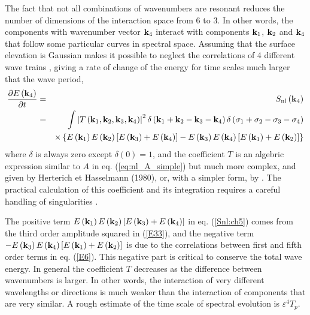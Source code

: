 The fact that not all combinations of wavenumbers are resonant reduces 
the number of dimensions of the interaction space from 6 to 3.  In other words, the components with wavenumber vector $\mathbf{k}_4$ interact with components 
$\mathbf{k}_1$, $\mathbf{k}_2$ and $\mathbf{k}_4$ that follow some particular curves in spectral space. Assuming that the surface elevation is Gaussian makes it possible to neglect 
the correlations of 4 different wave trains \citep{Hasselmann1962},  giving a rate of change of the energy for time scales much larger that the wave period, 
\begin{eqnarray}
\frac{\partial E \left(\mathbf{k}_4\right)}{\partial t}
    & = & S_{\mathrm{nl}} \left( \mathbf{k}_4 \right) \nonumber\\
    & = & \int
    \left|T \left(\mathbf{k}_1,\mathbf{k}_2,\mathbf{k}_3,\mathbf{k}_4 \right)
    \right|^2
 \delta\left(\mathbf{k}_1+\mathbf{k}_2-\mathbf{k}_3-\mathbf{k}_4\right)
    \delta\left(\sigma_1+\sigma_2-\sigma_3-\sigma_4\right) \label{Snl:ch5}\\
 &&   \times \left\{E\left(\mathbf{k}_1\right)E\left(\mathbf{k}_2\right)
    \left[E\left(\mathbf{k}_3\right)+E\left(\mathbf{k}_4\right)\right]
    -E\left(\mathbf{k}_3\right)E\left(\mathbf{k}_4\right)
    \left[E\left(\mathbf{k}_1\right)+E\left(\mathbf{k}_2\right)\right]\right\}
    \nonumber
\end{eqnarray}
where $\delta$ is always zero except $\delta(0)=1$, and the coefficient $T$ is an algebric expression similar to $A$ in eq. (\ref{eq:nl_A_simple}) but much more complex, and given by Herterich
et Hasselmann (1980\nocite{Herterich&Hasselmann1980}), or, with a simpler form, by  \cite{Zakharov1999}. 
The practical calculation of this coefficient and its integration requires a careful handling of singularities \citep[e.g.][]{Gorman2003}. 

The positive term $E\left(\mathbf{k}_1\right)E\left(\mathbf{k}_2\right)
    \left[E\left(\mathbf{k}_3\right)+E\left(\mathbf{k}_4\right)\right]$ in eq. (\ref{Snl:ch5}) comes from the third order amplitude squared in (\ref{E33}), 
and the negative term $-E\left(\mathbf{k}_3\right)E\left(\mathbf{k}_4\right)
    \left[E\left(\mathbf{k}_1\right)+E\left(\mathbf{k}_2\right)\right]$ is due to the correlations between 
first and fifth order terms in eq. (\ref{E6}). 
This negative part is critical to conserve the total wave energy. In general the coefficient $T$ decreases as the difference between wavenumbers 
is larger. In other words, the interaction of very different wavelengths or directions is much weaker than the interaction of
components that are very similar. A rough estimate of the time scale of spectral evolution is $\varepsilon^4
T_p$. 

